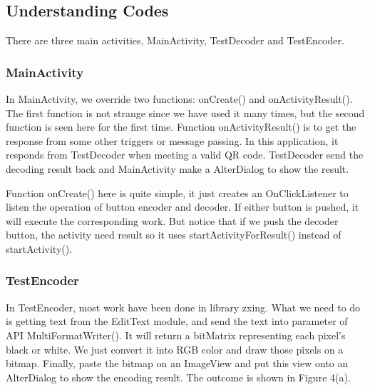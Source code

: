 \documentclass{article}
\begin{document}
\subsection{Understanding Codes}
There are three main activities, MainActivity, TestDecoder and TestEncoder.
\subsubsection{MainActivity}
In MainActivity, we override two functions: onCreate() and onActivityResult(). The first function is not strange since we have used it many times, but the second function is seen here for the first time. Function onActivityResult() is to get the response from some other triggers or message passing. In this application, it responds from TestDecoder when meeting a valid QR code. TestDecoder send the decoding result back and MainActivity make a AlterDialog to show the result.

Function onCreate() here is quite simple, it just creates an OnClickListener to listen the operation of button encoder and decoder. If either button is pushed, it will execute the corresponding work. But notice that if we push the decoder button, the activity need result so it uses startActivityForResult() instead of startActivity().

\subsubsection{TestEncoder}
In TestEncoder, most work have been done in library zxing. What we need to do is getting text from the EditText module, and send the text into parameter of API MultiFormatWriter(). It will return a bitMatrix representing each pixel's black or white. We just convert it into RGB color and draw those pixels on a bitmap. Finally, paste the bitmap on an ImageView and put this view onto an AlterDialog to show the encoding result. The outcome is shown in Figure 4(a).
\end{document}

